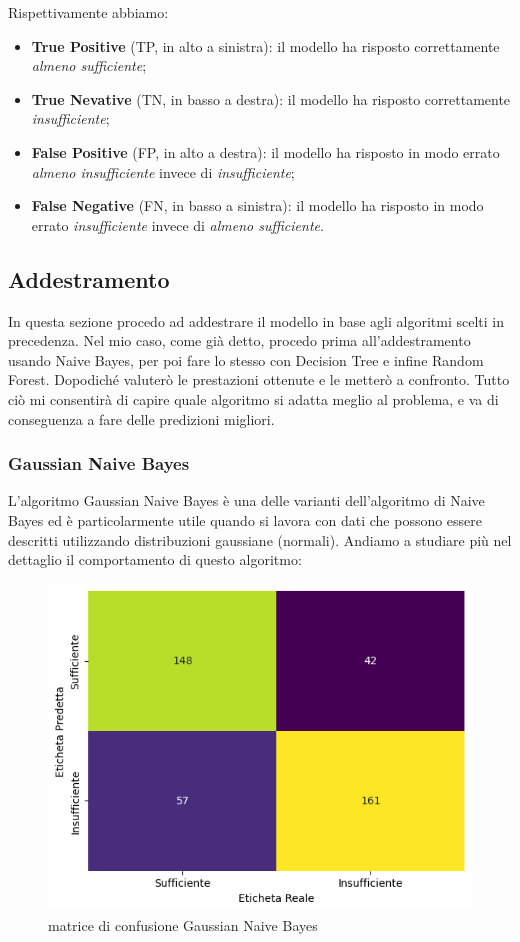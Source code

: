 \documentclass{article}
\begin{document}
\begin{titlepage}
        Rispettivamente abbiamo: 
         \begin{itemize}
            \item \textbf{True Positive} (TP, in alto a sinistra): il modello ha risposto correttamente \textit{almeno sufficiente};
            \item \textbf{True Nevative} (TN, in basso a destra): il modello ha risposto correttamente \textit{insufficiente};
            \item \textbf{False Positive} (FP, in alto a destra): il modello ha risposto in modo errato \textit{almeno insufficiente} invece di \textit{insufficiente};
            \item \textbf{False Negative} (FN, in basso a sinistra):
            il modello ha risposto in modo errato \textit{insufficiente} invece di \textit{almeno sufficiente}.
            
        \end{itemize}

         
        \subsection{Addestramento}
         In questa sezione procedo ad addestrare il modello in base agli algoritmi scelti in precedenza. Nel mio caso, come già detto, procedo prima all’addestramento usando Naive Bayes, per poi fare lo stesso con Decision Tree e infine Random Forest. Dopodiché valuterò le
         prestazioni ottenute e le metterò a confronto. Tutto ciò mi consentirà di capire quale algoritmo si adatta meglio al problema, e va di conseguenza a fare delle predizioni migliori.
        
        \newpage
        \subsubsection{Gaussian Naive Bayes}
         L'algoritmo Gaussian Naive Bayes è una delle varianti dell'algoritmo di Naive Bayes ed è particolarmente utile quando si lavora con dati che possono essere descritti utilizzando distribuzioni gaussiane (normali). Andiamo a studiare più nel dettaglio il comportamento di questo algoritmo:

         \begin{figure}[ht]
            \centering
            \includegraphics[width=0.6\linewidth]{confusion_matrix-GNB.png}
            \caption{  matrice di confusione Gaussian Naive Bayes}
            \label{fig:enter-label}
        \end{figure}
        

\end{titlepage}
\end{document}
